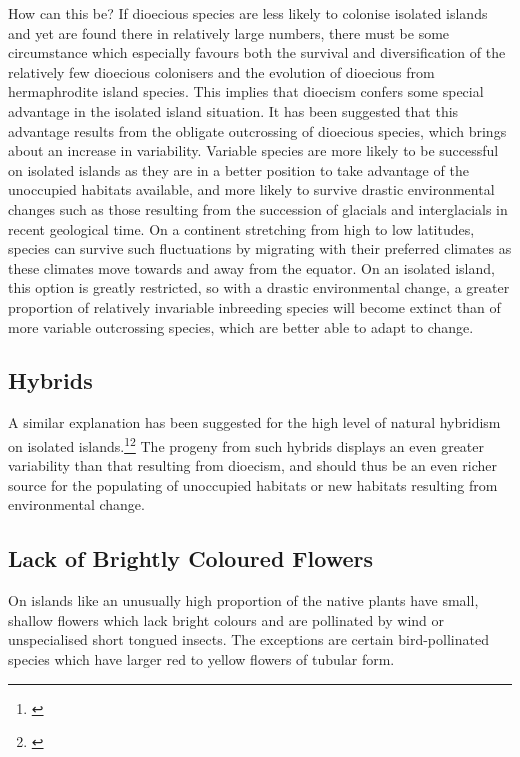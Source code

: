 How can this be? If dioecious species are less likely to colonise isolated islands and yet are found there in relatively large numbers, there must be some circumstance which especially favours both the survival and diversification of the relatively few dioecious colonisers and the evolution of dioecious from hermaphrodite island species.
This implies that dioecism confers some special advantage in the isolated island situation.
It has been suggested that this advantage results from the obligate outcrossing of dioecious species, which brings about an increase in variability.
Variable species are more likely to be successful on isolated islands as they are in a better position to take advantage of the unoccupied habitats available, and more likely to survive drastic environmental changes such as those resulting from the succession of glacials and interglacials in recent geological time.
On a continent stretching from high to low latitudes, species can survive such fluctuations by migrating with their preferred climates as these climates move towards and away from the equator.
On an isolated island, this option is greatly restricted, so with a drastic environmental change, a greater proportion of relatively invariable inbreeding species will become extinct than of more variable outcrossing species, which are better able to adapt to change.

\subsection{Hybrids}

A similar explanation has been suggested for the high level of natural hybridism on isolated islands.\footnote{\cite{gillett1972role}}\footnote{\cite{rattenbury1962cyclic}} The progeny from such hybrids displays an even greater variability than that resulting from dioecism, and should thus be an even richer source for the populating of unoccupied habitats or new habitats resulting from environmental change.

\subsection{Lack of Brightly Coloured Flowers}

On islands like  an unusually high proportion of the native plants have small, shallow flowers which lack bright colours and are pollinated by wind or unspecialised short tongued insects.
The exceptions are certain bird-pollinated species which have larger red to yellow flowers of tubular form.

